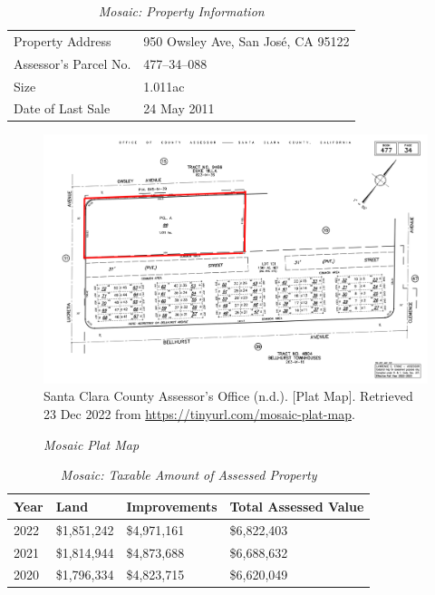 \begin{table}[htb]
  \SingleSpacing%
  \caption[Mosaic: Property Information]{\textit{Mosaic: Property Information}}\label{tab:mosaic-prop-info}
  \begin{tabular}{ll}
    \toprule
    Property Address      & 950 Owsley Ave, San José, CA 95122 \\
    Assessor's Parcel No. & 477–34–088 \\
    Size                  & 1.011ac \\
    Date of Last Sale     & 24 May 2011 \\
    \bottomrule
  \end{tabular}
\end{table}

\begin{figure}[hbt]
    \caption[Mosaic Plat Map]{\textit{Mosaic Plat Map}}\label{fig:mosaic-plat-map}
    \includegraphics[width=\textwidth]{Assessor-Info/mosaic-plat-map-477-34}\\ %
    \footnotesize{Santa Clara County Assessor's Office (n.d.). [Plat Map]. Retrieved 23 Dec 2022 from  \url{https://tinyurl.com/mosaic-plat-map}}.
\end{figure}

\begin{table}[hbt]
  \SingleSpacing%
  \caption[Mosaic: Taxable Amount of Assessed Propery]{\textit{Mosaic: Taxable Amount of Assessed Property}}\label{tab:mosaic-taxable-amount}
  \begin{tabular}{llll}
    \toprule
    Year & Land        & Improvements & Total Assessed Value \\
    \midrule
    2022 & \$1,851,242 & \$4,971,161 & \$6,822,403 \\
    2021 & \$1,814,944 & \$4,873,688 & \$6,688,632 \\
    2020 & \$1,796,334 & \$4,823,715 & \$6,620,049 \\
    \bottomrule
  \end{tabular}
\end{table}

